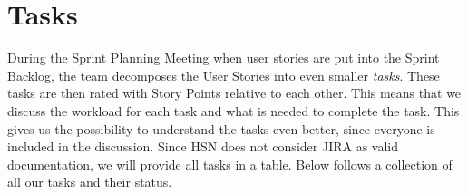 \section{Tasks}
During the Sprint Planning Meeting when user stories are put into the Sprint Backlog, the team decomposes the User Stories into even smaller \textit{tasks}. These tasks are then rated with Story Points relative to each other. This means that we discuss the workload for each task and what is needed to complete the task. This gives us the possibility to understand the tasks even better, since everyone is included in the discussion. Since HSN does not consider JIRA as valid documentation, we will provide all tasks in a table. Below follows a collection of all our tasks and their status.  

\vspace*{1cm}

